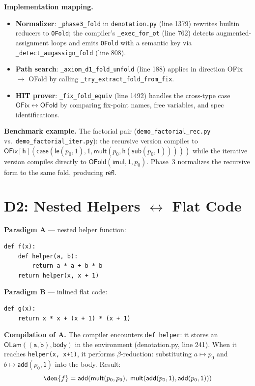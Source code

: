 \textbf{Implementation mapping.}
\begin{itemize}
  \item \textbf{Normalizer}: \texttt{\_phase3\_fold} in
    \texttt{denotation.py} (line 1379) rewrites builtin reducers to
    \texttt{OFold}; the compiler's \texttt{\_exec\_for\_ot}
    (line 762) detects augmented-assignment loops and emits
    \texttt{OFold} with a semantic key via
    \texttt{\_detect\_augassign\_fold} (line 808).
  \item \textbf{Path search}: \texttt{\_axiom\_d1\_fold\_unfold}
    (line 188) applies in direction OFix $\to$ OFold by calling
    \texttt{\_try\_extract\_fold\_from\_fix}.
  \item \textbf{HIT prover}: \texttt{\_fix\_fold\_equiv}
    (line 1492) handles the cross-type case
    $\mathsf{OFix} \leftrightarrow \mathsf{OFold}$ by comparing
    fix-point names, free variables, and spec identifications.
\end{itemize}

\textbf{Benchmark example.}
The factorial pair (\texttt{demo\_factorial\_rec.py} vs.\
\texttt{demo\_factorial\_iter.py}): the recursive version compiles to
$\mathsf{OFix}[\mathsf{h}](\mathsf{case}(\mathsf{le}(p_0, 1),
\mathsf{1}, \mathsf{mult}(p_0, \mathsf{h}(\mathsf{sub}(p_0,1)))))$
while the iterative version compiles directly to
$\mathsf{OFold}(\mathsf{imul}, \mathsf{1}, p_0)$.
Phase~3 normalizes the recursive form to the same fold,
producing $\mathsf{refl}$.


\section{D2: Nested Helpers $\leftrightarrow$ Flat Code}
\label{sec:d2}

\textbf{Paradigm A} --- nested helper function:
\begin{lstlisting}
def f(x):
    def helper(a, b):
        return a * a + b * b
    return helper(x, x + 1)
\end{lstlisting}

\textbf{Paradigm B} --- inlined flat code:
\begin{lstlisting}
def g(x):
    return x * x + (x + 1) * (x + 1)
\end{lstlisting}

\textbf{Compilation of A.}
The compiler encounters \texttt{def helper}: it stores an
$\mathsf{OLam}((\texttt{a}, \texttt{b}), \mathsf{body})$ in the
environment (denotation.py, line 241).  When it reaches
\texttt{helper(x, x+1)}, it performs $\beta$-reduction:
substituting $a \mapsto p_0$ and
$b \mapsto \mathsf{add}(p_0, \mathsf{1})$
into the body.  Result:
\[
  \den{f} = \mathsf{add}(\mathsf{mult}(p_0, p_0),\;
    \mathsf{mult}(\mathsf{add}(p_0, \mathsf{1}),
                   \mathsf{add}(p_0, \mathsf{1})))
\]

